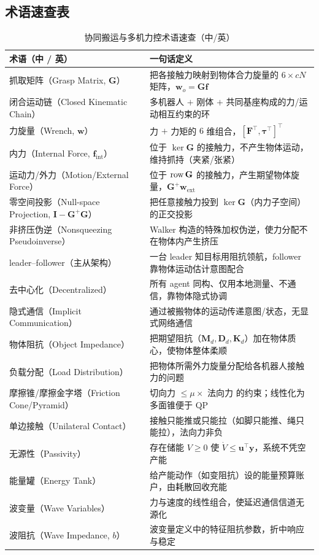 \subsection*{术语速查表}
\begin{table}[H]\centering\small
\caption{协同搬运与多机力控术语速查（中/英）}
\label{tab:cm-glossary}
\begin{tabular}{p{5.2cm}p{8.0cm}}
\toprule
术语（中 / 英） & 一句话定义 \\
\midrule
抓取矩阵（Grasp Matrix, $\mathbf{G}$） & 把各接触力映射到物体合力旋量的 $6\times cN$ 矩阵，$\mathbf{w}_o=\mathbf{G}\mathbf{f}$ \\
闭合运动链（Closed Kinematic Chain） & 多机器人 $+$ 刚体 $+$ 共同基座构成的力/运动相互约束的环 \\
力旋量（Wrench, $\mathbf{w}$） & 力 $+$ 力矩的 $6$ 维组合，$[\mathbf{F}^\top,\boldsymbol{\tau}^\top]^\top$ \\
内力（Internal Force, $\mathbf{f}_{\text{int}}$） & 位于 $\ker\mathbf{G}$ 的接触力，不产生物体运动，维持抓持（夹紧/张紧） \\
运动力/外力（Motion/External Force） & 位于 $\operatorname{row}\mathbf{G}$ 的接触力，产生期望物体旋量，$\mathbf{G}^{+}\mathbf{w}_{\text{ext}}$ \\
零空间投影（Null-space Projection, $\mathbf{I}-\mathbf{G}^{+}\mathbf{G}$） & 把任意接触力投到 $\ker\mathbf{G}$（内力子空间）的正交投影 \\
非挤压伪逆（Nonsqueezing Pseudoinverse） & Walker 构造的特殊加权伪逆，使力分配不在物体内产生挤压 \\
leader--follower（主从架构） & 一台 leader 知目标用阻抗领航，follower 靠物体运动估计意图配合 \\
去中心化（Decentralized） & 所有 agent 同构、仅用本地测量、不通信，靠物体隐式协调 \\
隐式通信（Implicit Communication） & 通过被搬物体的运动传递意图/状态，无显式网络通信 \\
物体阻抗（Object Impedance） & 把期望阻抗（$\mathbf{M}_d,\mathbf{D}_d,\mathbf{K}_d$）加在物体质心，使物体整体柔顺 \\
负载分配（Load Distribution） & 把物体所需外力旋量分配给各机器人接触力的问题 \\
摩擦锥/摩擦金字塔（Friction Cone/Pyramid） & 切向力 $\le\mu\times$ 法向力 的约束；线性化为多面锥便于 QP \\
单边接触（Unilateral Contact） & 接触只能推或只能拉（如脚只能推、绳只能拉），法向力非负 \\
无源性（Passivity） & 存在储能 $V\ge 0$ 使 $\dot V\le\mathbf{u}^\top\mathbf{y}$，系统不凭空产能 \\
能量罐（Energy Tank） & 给产能动作（如变阻抗）设的能量预算账户，由耗散回收充能 \\
波变量（Wave Variables） & 力与速度的线性组合，使延迟通信信道无源化 \\
波阻抗（Wave Impedance, $b$） & 波变量定义中的特征阻抗参数，折中响应与稳定 \\
\bottomrule
\end{tabular}
\end{table}

